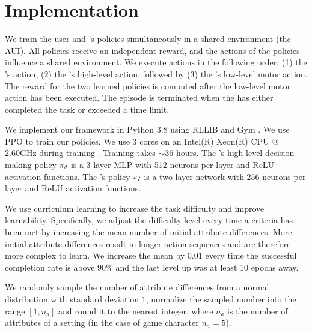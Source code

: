 \section{Implementation}
We train the user and \interfaceagent's policies simultaneously in a shared environment (the AUI). All policies receive an independent reward, and the actions of the policies influence a shared environment. We execute actions in the following order: (1) the \interfaceagent's action, (2) the \useragent's high-level action, followed by (3) the \useragent's low-level motor action. The reward for the two learned policies is computed after the low-level motor action has been executed. The episode is terminated when the \useragent has either completed the task or exceeded a time limit.

We implement our framework in Python 3.8 using RLLIB \cite{liang2018rllib} and Gym \cite{brockman2016openai}. We use PPO  to train our policies. We use 3 cores on an Intel(R) Xeon(R) CPU @ 2.60GHz during training . Training takes $\sim$36 hours.  The \useragent's high-level decision-making policy $\pi_d$ is a 3-layer MLP with 512 neurons per layer and ReLU activation functions. The  \interfaceagent's policy  $\pi_I$ is a two-layer network with 256 neurons per layer and ReLU activation functions.  

We use curriculum learning to increase the task difficulty and improve learnability. Specifically, we adjust the difficulty level every time a criteria has been met by increasing the mean number of initial attribute differences. More initial attribute differences result in longer action sequences and are therefore more complex to learn. We increase the mean by 0.01 every time the successful completion rate is above 90\% and the last level up was at least 10 epochs away.

We randomly sample the number of attribute differences from a normal distribution with standard deviation $1$, normalize the sampled number into the range $[1, n_a]$ and round it to the nearest integer, where $n_a$ is the number of attributes of a setting (in the case of game character $n_a=5$).

